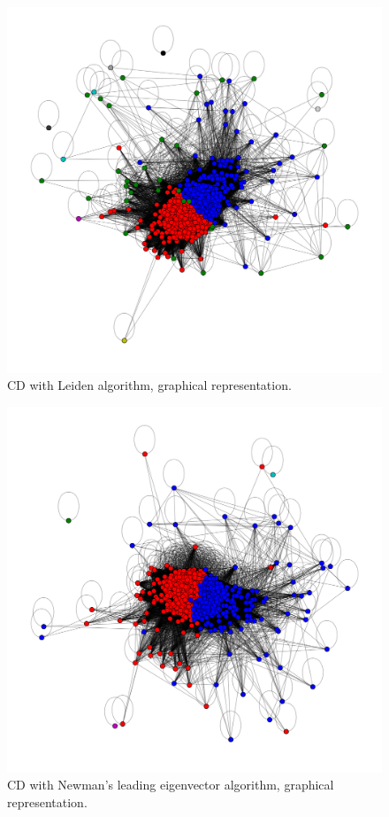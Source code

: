 \documentclass[sigchi]{acmart}
\begin{document}
\begin{figure}[H]
	\centering
	\includegraphics[width=\linewidth]{CD_lei.png}
	\caption{CD with Leiden algorithm, graphical representation.}
\end{figure}

\begin{figure}[H]
	\centering
	\includegraphics[width=\linewidth]{CD_Eig.png}
	\caption{CD with Newman's leading eigenvector algorithm, graphical representation.}
\end{figure}
\end{document}
